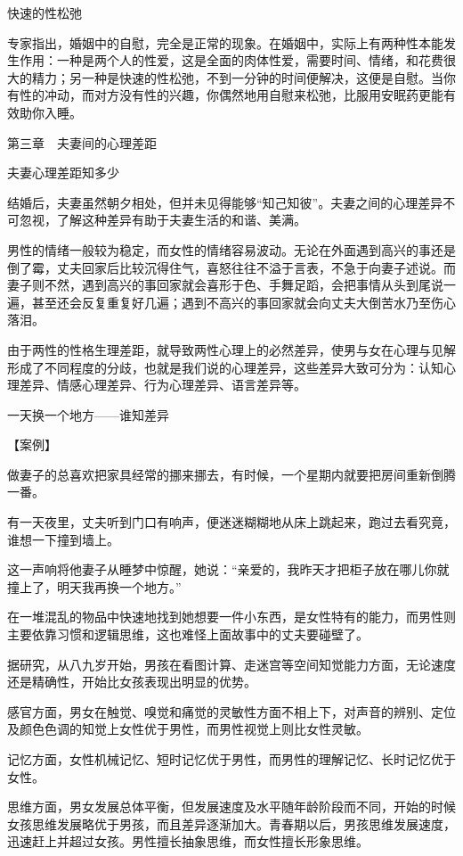 \documentclass[12pt,UTF8]{ctexbook}
\begin{document}
快速的性松弛


专家指出，婚姻中的自慰，完全是正常的现象。在婚姻中，实际上有两种性本能发生作用：一种是两个人的性爱，这是全面的肉体性爱，需要时间、情绪，和花费很大的精力；另一种是快速的性松弛，不到一分钟的时间便解决，这便是自慰。当你有性的冲动，而对方没有性的兴趣，你偶然地用自慰来松弛，比服用安眠药更能有效助你入睡。





第三章　夫妻间的心理差距


夫妻心理差距知多少


结婚后，夫妻虽然朝夕相处，但并未见得能够“知己知彼”。夫妻之间的心理差异不可忽视，了解这种差异有助于夫妻生活的和谐、美满。

男性的情绪一般较为稳定，而女性的情绪容易波动。无论在外面遇到高兴的事还是倒了霉，丈夫回家后比较沉得住气，喜怒往往不溢于言表，不急于向妻子述说。而妻子则不然，遇到高兴的事回家就会喜形于色、手舞足蹈，会把事情从头到尾说一遍，甚至还会反复重复好几遍；遇到不高兴的事回家就会向丈夫大倒苦水乃至伤心落泪。

由于两性的性格生理差距，就导致两性心理上的必然差异，使男与女在心理与见解形成了不同程度的分歧，也就是我们说的心理差异，这些差异大致可分为：认知心理差异、情感心理差异、行为心理差异、语言差异等。





一天换一个地方——谁知差异


【案例】

做妻子的总喜欢把家具经常的挪来挪去，有时候，一个星期内就要把房间重新倒腾一番。

有一天夜里，丈夫听到门口有响声，便迷迷糊糊地从床上跳起来，跑过去看究竟，谁想一下撞到墙上。

这一声响将他妻子从睡梦中惊醒，她说：“亲爱的，我昨天才把柜子放在哪儿你就撞上了，明天我再换一个地方。”

在一堆混乱的物品中快速地找到她想要一件小东西，是女性特有的能力，而男性则主要依靠习惯和逻辑思维，这也难怪上面故事中的丈夫要碰壁了。

据研究，从八九岁开始，男孩在看图计算、走迷宫等空间知觉能力方面，无论速度还是精确性，开始比女孩表现出明显的优势。

感官方面，男女在触觉、嗅觉和痛觉的灵敏性方面不相上下，对声音的辨别、定位及颜色色调的知觉上女性优于男性，而男性视觉上则比女性灵敏。

记忆方面，女性机械记忆、短时记忆优于男性，而男性的理解记忆、长时记忆优于女性。

思维方面，男女发展总体平衡，但发展速度及水平随年龄阶段而不同，开始的时候女孩思维发展略优于男孩，而且差异逐渐加大。青春期以后，男孩思维发展速度，迅速赶上并超过女孩。男性擅长抽象思维，而女性擅长形象思维。
\end{document}
